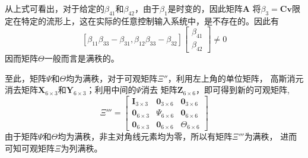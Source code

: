\documentclass{article}
\begin{document}
从上式可看出，对于给定的$\beta_{41}$和$\beta_{42}$，由于$\beta_1$是时变的，因此矩阵$\textbf{A}$
将$\beta_3=\textbf{Cv}$限定在特定的流形上，这在实际的任意控制输入系统中，是不存在的。因此有
\begin{equation}
    \left[\beta_{11}\beta_{33}-\beta_{31}, \beta_{12}\beta_{33}-\beta_{32}\right]
    \left[\begin{array}{c}
        \beta_{41}\\\beta_{42}
    \end{array}\right]\not=0
\end{equation}
因而矩阵$\Theta$一般而言是满秩的。

\par
至此，矩阵$\Psi$和$\Theta$均为满秩，对于可观矩阵$\Xi''$，利用左上角的单位矩阵，
高斯消元消去矩阵$\textbf{X}_{6\times 3}$和$\textbf{Y}_{6\times 3}$；利用中间的$\Psi$消去
矩阵$\textbf{Z}_{6\times 6}$，即可得到新的可观矩阵,
\begin{equation}
    \Xi'''=\left[\begin{array}{ccc} \textbf{I}_{3\times 3}& \textbf{0}_{3\times 6}& \textbf{0}_{3\times 6}\\
        \textbf{0}_{6\times 3}& {\Psi}_{6\times 6}& \textbf{0}_{6\times 6}\\
        \textbf{0}_{6\times 3}& \mathbf{0}_{6\times 6}& {\Theta}_{6\times 6}
        \end{array}\right]
\end{equation}
由于矩阵$\Psi$和$\Theta$均为满秩，非主对角线元素均为零，所以有矩阵$\Xi'''$为满秩，
进而可知可观矩阵$\Xi$为列满秩。
\end{document}
